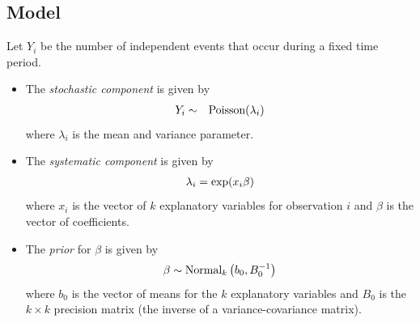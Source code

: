 \documentclass[letterpaper,10pt,english]{sphinxmanual}
\begin{document}
\subsection{Model}
\label{vignette:id95}
Let \(Y_{i}\) be the number of independent events that occur during
a fixed time period.
\begin{itemize}
\item {} 
The \emph{stochastic component} is given by
\begin{gather}
\begin{split}\begin{aligned}
Y_{i}  &  \sim & \textrm{Poisson}(\lambda_i)\end{aligned}\end{split}\notag
\end{gather}
where \(\lambda_i\) is the mean and variance parameter.

\item {} 
The \emph{systematic component} is given by
\begin{gather}
\begin{split}\begin{aligned}
\lambda_{i}= \exp(x_{i} \beta)\end{aligned}\end{split}\notag
\end{gather}
where \(x_{i}\) is the vector of \(k\) explanatory variables
for observation \(i\) and \(\beta\) is the vector of
coefficients.

\item {} 
The \emph{prior} for \(\beta\) is given by
\begin{gather}
\begin{split}\begin{aligned}
\beta \sim \textrm{Normal}_k \left(  b_{0},B_{0}^{-1}\right)\end{aligned}\end{split}\notag
\end{gather}
where \(b_{0}\) is the vector of means for the \(k\)
explanatory variables and \(B_{0}\) is the \(k \times k\)
precision matrix (the inverse of a variance-covariance matrix).

\end{itemize}
\end{document}
